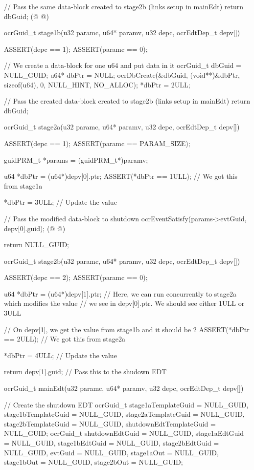 \begin{ocrsnip}
{    // Pass the same data-block created to stage2b (links setup in mainEdt)
    return dbGuid; (@ \label{line:EdtGuidReturn} @)
}

ocrGuid_t stage1b(u32 paramc, u64* paramv, u32 depc, ocrEdtDep_t depv[]) {
    ASSERT(depc == 1);
    ASSERT(paramc == 0);

    // We create a data-block for one u64 and put data in it
    ocrGuid_t dbGuid = NULL_GUID;
    u64* dbPtr = NULL;
    ocrDbCreate(&dbGuid, (void**)&dbPtr, sizeof(u64), 0, NULL_HINT, NO_ALLOC);
    *dbPtr = 2ULL;

    // Pass the created data-block created to stage2b (links setup in mainEdt)
    return dbGuid;
}

ocrGuid_t stage2a(u32 paramc, u64* paramv, u32 depc, ocrEdtDep_t depv[]) {
    ASSERT(depc == 1);
    ASSERT(paramc == PARAM_SIZE);

    guidPRM_t *params = (guidPRM_t*)paramv;

    u64 *dbPtr = (u64*)depv[0].ptr;
    ASSERT(*dbPtr == 1ULL); // We got this from stage1a

    *dbPtr = 3ULL; // Update the value

    // Pass the modified data-block to shutdown
    ocrEventSatisfy(params->evtGuid, depv[0].guid); (@ \label{line:expSatisfy} @)

    return NULL_GUID;
}

ocrGuid_t stage2b(u32 paramc, u64* paramv, u32 depc, ocrEdtDep_t depv[]) {
    ASSERT(depc == 2);
    ASSERT(paramc == 0);

    u64 *dbPtr = (u64*)depv[1].ptr;
    // Here, we can run concurrently to stage2a which modifies the value
    // we see in depv[0].ptr. We should see either 1ULL or 3ULL

    // On depv[1], we get the value from stage1b and it should be 2
    ASSERT(*dbPtr == 2ULL); // We got this from stage2a

    *dbPtr = 4ULL; // Update the value

    return depv[1].guid; // Pass this to the shudown EDT
}


ocrGuid_t mainEdt(u32 paramc, u64* paramv, u32 depc, ocrEdtDep_t depv[]) {

    // Create the shutdown EDT
    ocrGuid_t stage1aTemplateGuid = NULL_GUID, stage1bTemplateGuid = NULL_GUID,
        stage2aTemplateGuid = NULL_GUID, stage2bTemplateGuid = NULL_GUID,
        shutdownEdtTemplateGuid = NULL_GUID;
    ocrGuid_t shutdownEdtGuid = NULL_GUID, stage1aEdtGuid = NULL_GUID,
        stage1bEdtGuid = NULL_GUID, stage2bEdtGuid = NULL_GUID,
        evtGuid = NULL_GUID, stage1aOut = NULL_GUID, stage1bOut = NULL_GUID,
        stage2bOut = NULL_GUID;

}
\end{ocrsnip}
